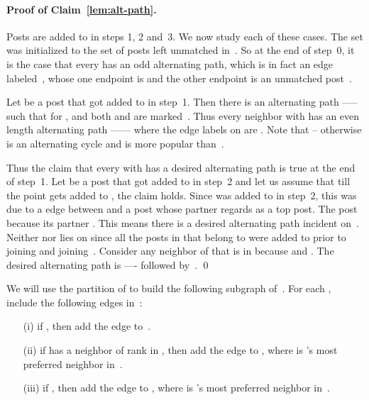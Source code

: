 \documentclass[11pt]{llncs}
\begin{document}
\paragraph{Proof of Claim~\ref{lem:alt-path}.}
Posts are added to  in steps 1, 2 and~3. We now study each of these cases. The set  was initialized to the set of posts left unmatched in~. So at the end of step~0, it is the case that every  has an odd alternating path, which is in fact an edge  labeled~, whose one endpoint is  and the
other endpoint is an unmatched post~.

Let  be a post that got added to  in step~1. Then there is an alternating path 
----- such that  for , and both  and 
 are marked~. Thus every neighbor  with  has an even 
length alternating path ------ where the edge labels on  
are . Note that  -- otherwise  is an alternating cycle and
 is more popular than~.

Thus the claim that every  with  has a desired alternating path  is true at
the end of step~1. Let  be a post that got added to  in step~2 and
let us assume that till the point  gets added to , the claim holds.
Since  was added to  in step~2, this was due to a  edge between  
and a post  whose partner  regards  as a top post. 
The post  because its partner . 
This means there is a desired alternating path  incident on~.
Neither  nor  lies on  since all the posts in  that belong to 
 were added to  prior to  joining  and  joining~. 
Consider any neighbor  of  that is in  because  and . 
The desired alternating path  is ---- followed by~. \qed


\medskip

We will use the partition  of  
to build the following subgraph  of~. For each , 
include the following edges in~:  
\begin{itemize}
\item[(i)] if , then add the edge  to~.
\item[(ii)] if  has a neighbor of rank  in , then add the edge  to , 
where  is 's most preferred neighbor in~.
\item[(iii)] if , then add the edge  to , where  is 's most 
preferred neighbor in~.
\end{itemize}
\end{document}
